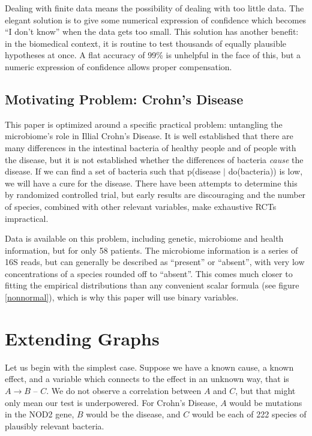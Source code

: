 \documentclass[twocolumn,12pt]{article}
\begin{document}
Dealing with finite data means the possibility of dealing with too
little data.  The elegant solution is to give some numerical
expression of confidence which becomes ``I don't know'' when the data
gets too small.  This solution has another benefit: in the biomedical
context, it is routine to test thousands of equally plausible
hypotheses at once.  A flat accuracy of 99\% is unhelpful in the face
of this, but a numeric expression of confidence allows proper
compensation.

\subsection{Motivating Problem: Crohn's Disease}

This paper is optimized around a specific practical problem:
untangling the microbiome's role in Illial Crohn's Disease.  It is
well established that there are many differences in the intestinal
bacteria of healthy people and of people with the disease\cite{hofer}, but it is
not established whether the differences of bacteria \textit{cause} the
disease.  If we can find a set of bacteria such that
p(disease $|$ do(bacteria)) is low, we will have a cure for the disease.
There have been attempts to determine this by randomized controlled
trial, but early results are discouraging\cite{rctma} and the number
of species, combined with other relevant
variables, make exhaustive RCTs impractical.

Data is available on this problem\cite{data}, including genetic, microbiome and
health information, but for only 58 patients.  The microbiome
information is a series of 16S reads, but can generally be described
as ``present'' or ``absent'', with very low concentrations of a
species rounded off to ``absent''.  This comes much closer to fitting
the empirical distributions than any convenient scalar formula (see
figure \ref{nonnormal}), which is why this paper will use binary variables.

\section{Extending Graphs}

Let us begin with the simplest case.  Suppose we have a known cause, a
known effect, and a variable which connects to the effect in an
unknown way, that is $A \rightarrow B$ -- $C$.  We do not observe a
correlation between $A$ and $C$, but that might only mean our test is
underpowered.  For Crohn's Disease, $A$ would be mutations in the NOD2
gene\cite{nod2}, $B$ would be the disease, and $C$ would be each of 222
species of plausibly relevant bacteria.
\end{document}

